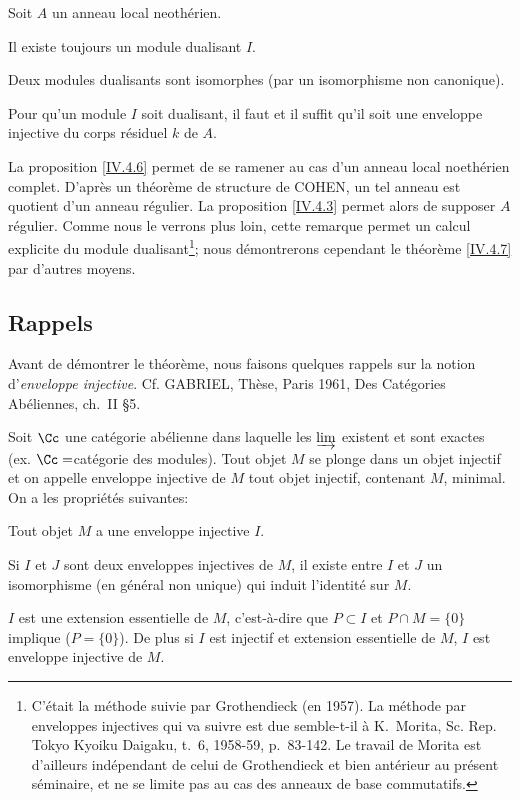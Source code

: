 \begin{theoreme} \label{IV.4.7}
Soit $A$ un anneau local neoth\'erien.
\begin{enumeratea}
\item
Il existe toujours un module dualisant $I$.

\item
Deux modules dualisants sont isomorphes (par un isomorphisme non canonique).

\item
Pour qu'un module $I$ soit dualisant, il faut et il suffit qu'il soit une enveloppe injective du corps r\'esiduel $k$ de $A$.
\end{enumeratea}
\end{theoreme}

\begin{remarque} \label{IV.4.8}
La proposition \ref{IV.4.6} permet de se ramener au cas d'un anneau local noeth\'erien complet. D'apr\`es un th\'eor\`eme de structure de COHEN, un tel anneau est quotient d'un anneau r\'egulier. La proposition \ref{IV.4.3} permet alors de supposer $A$ r\'egulier. Comme nous le verrons plus loin, cette remarque permet un calcul explicite du module dualisant\footnote{C'\'etait la m\'ethode suivie par Grothendieck (en 1957). La m\'ethode par enveloppes injectives qui va suivre est due semble-t-il \`a K.\, Morita, Sc. Rep. Tokyo Kyoiku Daigaku, t.\, 6, 1958-59, p.\, 83-142. Le travail de Morita est d'ailleurs ind\'ependant de celui de Grothendieck et bien ant\'erieur au pr\'esent s\'eminaire, et ne se limite pas au cas des anneaux de base commutatifs.}; nous d\'emontrerons cependant le th\'eor\`eme \ref{IV.4.7} par d'autres moyens.
\end{remarque}

\subsection*{Rappels}
Avant de d\'emontrer le th\'eor\`eme, nous faisons quelques rappels sur la notion d'\emph{enveloppe injective}. Cf. GABRIEL, Th\`ese, Paris 1961, Des Cat\'egories Ab\'eliennes, ch.\, II \S 5.

Soit $\Cc$ une cat\'egorie ab\'elienne dans laquelle les $\varinjlim$ existent et sont exactes (ex. $\Cc=$cat\'egorie des modules). Tout objet $M$ se plonge dans un objet injectif et on appelle enveloppe injective de $M$ tout objet injectif, contenant $M$, minimal. On a les propri\'et\'es suivantes:
\begin{enumeratei}
\item
Tout objet $M$ a une enveloppe injective $I$.
\item
Si $I$ et $J$ sont deux enveloppes injectives de $M$, il existe entre $I$ et $J$ un isomorphisme (en g\'en\'eral non unique) qui induit l'identit\'e sur $M$.
\item
$I$ est une extension essentielle\label{pIV.13} de $M$, c'est-\`a-dire que $P\subset I$ et $P\cap M=\{ 0\}$ implique ($P=\{ 0\}$). De plus si $I$ est injectif et extension essentielle de $M$, $I$ est enveloppe injective de $M$.
\end{enumeratei}

